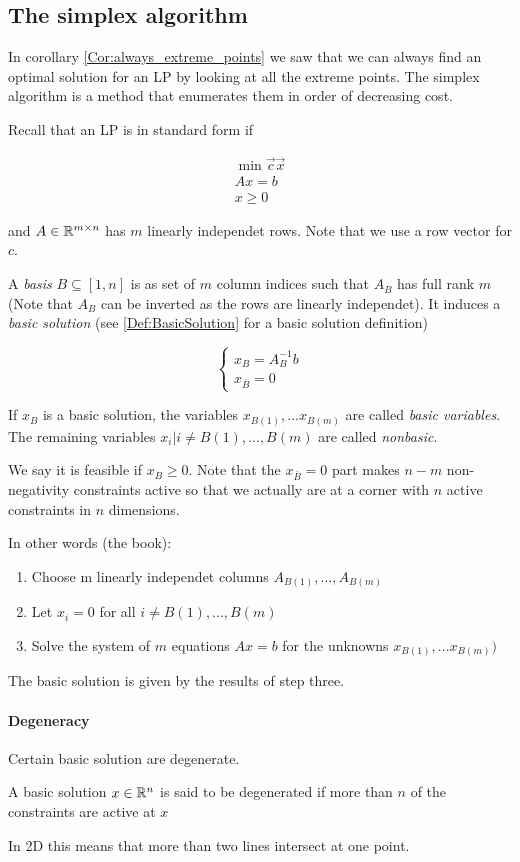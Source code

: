 \subsection{The simplex algorithm}

In corollary \ref{Cor:always_extreme_points} we saw that we can always find an optimal solution for an LP by looking at all the extreme points. The simplex algorithm is a method that enumerates them in order of decreasing cost. 

Recall that an LP is in standard form if

\begin{align*}
\min \vec c\vec x\\
Ax = b\\
x\geq 0
\end{align*}

and $A\in \mathbb{R}^{m\times n}$ has $m$ linearly independet rows. Note that we use a row vector for $c$.

A \emph{basis} $B\subseteq [1,n]$ is as set of $m$ column indices such that $A_B$ has full rank $m$ (Note that $A_B$ can be inverted as the rows are linearly independet). It induces a \emph{basic solution} (see \ref{Def:BasicSolution} for a basic solution definition)

\[\begin{cases} x_B = A^{-1}_Bb\\ x_{\bar B} = 0\end{cases}\]

If $x_B$ is a basic solution, the variables $x_{B(1)},...x_{B(m)}$ are called \emph{basic variables}. The remaining variables $x_i|i \neq B(1),...,B(m)$ are called \emph{nonbasic}. 

We say it is feasible if $x_B\geq 0$. Note that the $x_{\bar B}=0$ part makes $n-m$ non-negativity constraints active so that we actually are at a corner with $n$ active constraints in $n$ dimensions.

In other words (the book):
\begin{enumerate} 
 \item Choose m linearly independet columns $A_{B(1)},...,A_{B(m)}$
 \item Let $x_i=0$ for all $i \neq B(1),...,B(m)$
 \item Solve the system of $m$ equations $Ax=b$ for the unknowns $x_{B(1)},...x_{B(m)})$
\end{enumerate}
The basic solution is given by the results of step three.

\paragraph*{Degeneracy}
Certain basic solution are degenerate. 
\begin{Def}[Degeneracy]
 A basic solution $x\in \mathbb{R}^n$ is said to be degenerated if more than $n$ of the constraints are active at $x$ 
\end{Def}
In 2D this means that more than two lines intersect at one point.

